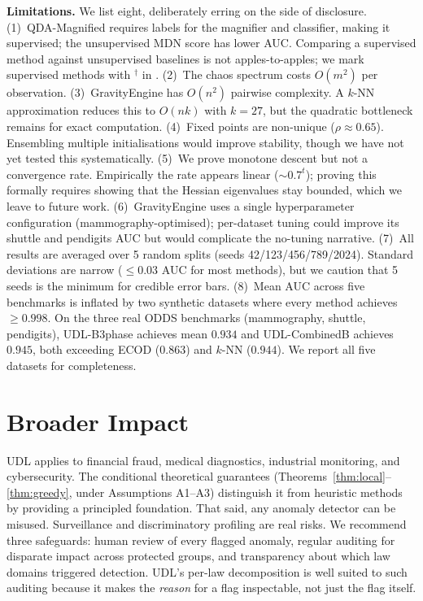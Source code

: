 \documentclass{article}
\begin{document}
\textbf{Limitations.} We list eight, deliberately erring on the side of disclosure. (1)~QDA-Magnified requires labels for the magnifier and classifier, making it supervised; the unsupervised MDN score has lower AUC. Comparing a supervised method against unsupervised baselines is not apples-to-apples; we mark supervised methods with $^\dagger$ in . (2)~The chaos spectrum costs $O(m^2)$ per observation. (3)~GravityEngine has $O(n^2)$ pairwise complexity. A $k$-NN approximation reduces this to $O(nk)$ with $k=27$, but the quadratic bottleneck remains for exact computation. (4)~Fixed points are non-unique ($\rho \approx 0.65$). Ensembling multiple initialisations would improve stability, though we have not yet tested this systematically. (5)~We prove monotone descent but not a convergence rate. Empirically the rate appears linear ($\sim 0.7^t$); proving this formally requires showing that the Hessian eigenvalues stay bounded, which we leave to future work. (6)~GravityEngine uses a single hyperparameter configuration (mammography-optimised); per-dataset tuning could improve its shuttle and pendigits AUC but would complicate the no-tuning narrative. (7)~All results are averaged over 5 random splits (seeds 42/123/456/789/2024). Standard deviations are narrow ($\leq 0.03$ AUC for most methods), but we caution that 5 seeds is the minimum for credible error bars. (8)~Mean AUC across five benchmarks is inflated by two synthetic datasets where every method achieves $\geq 0.998$. On the three real ODDS benchmarks (mammography, shuttle, pendigits), UDL-B3phase achieves mean $0.934$ and UDL-CombinedB achieves $0.945$, both exceeding ECOD ($0.863$) and $k$-NN ($0.944$). We report all five datasets for completeness.

\section{Broader Impact}
\label{sec:impact}

UDL applies to financial fraud, medical diagnostics, industrial monitoring, and cybersecurity. The conditional theoretical guarantees (Theorems~\ref{thm:local}--\ref{thm:greedy}, under Assumptions A1--A3) distinguish it from heuristic methods by providing a principled foundation. That said, any anomaly detector can be misused. Surveillance and discriminatory profiling are real risks. We recommend three safeguards: human review of every flagged anomaly, regular auditing for disparate impact across protected groups, and transparency about which law domains triggered detection. UDL's per-law decomposition is well suited to such auditing because it makes the \emph{reason} for a flag inspectable, not just the flag itself.
\end{document}
